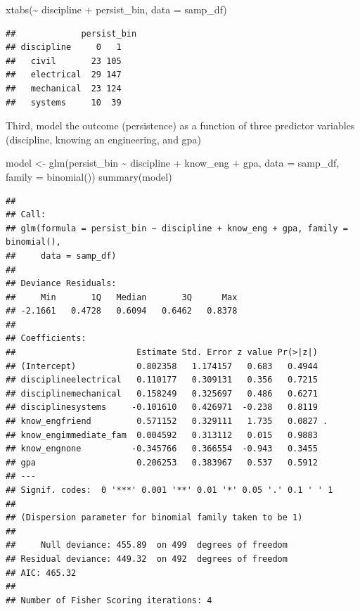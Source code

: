 \documentclass[
]{book}
\newenvironment{Shaded}{\begin{snugshade}}{\end{snugshade}}
\newcommand{\AttributeTok}[1]{\textcolor[rgb]{0.77,0.63,0.00}{#1}}
\newcommand{\FunctionTok}[1]{\textcolor[rgb]{0.00,0.00,0.00}{#1}}
\newcommand{\NormalTok}[1]{#1}
\newcommand{\OtherTok}[1]{\textcolor[rgb]{0.56,0.35,0.01}{#1}}
\newcommand{\SpecialCharTok}[1]{\textcolor[rgb]{0.00,0.00,0.00}{#1}}
\begin{document}
\begin{Shaded}
\begin{Highlighting}[]
\FunctionTok{xtabs}\NormalTok{(}\SpecialCharTok{\textasciitilde{}}\NormalTok{ discipline }\SpecialCharTok{+}\NormalTok{ persist\_bin, }\AttributeTok{data =}\NormalTok{ samp\_df)}
\end{Highlighting}
\end{Shaded}

\begin{verbatim}
##             persist_bin
## discipline     0   1
##   civil       23 105
##   electrical  29 147
##   mechanical  23 124
##   systems     10  39
\end{verbatim}

Third, model the outcome (persistence) as a function of three predictor variables (discipline, knowing an engineering, and gpa)

\begin{Shaded}
\begin{Highlighting}[]
\NormalTok{model }\OtherTok{\textless{}{-}} \FunctionTok{glm}\NormalTok{(persist\_bin }\SpecialCharTok{\textasciitilde{}}\NormalTok{ discipline }\SpecialCharTok{+}\NormalTok{ know\_eng }\SpecialCharTok{+}\NormalTok{ gpa, }\AttributeTok{data =}\NormalTok{ samp\_df, }\AttributeTok{family =} \FunctionTok{binomial}\NormalTok{())}
\FunctionTok{summary}\NormalTok{(model)}
\end{Highlighting}
\end{Shaded}

\begin{verbatim}
## 
## Call:
## glm(formula = persist_bin ~ discipline + know_eng + gpa, family = binomial(), 
##     data = samp_df)
## 
## Deviance Residuals: 
##     Min       1Q   Median       3Q      Max  
## -2.1661   0.4728   0.6094   0.6462   0.8378  
## 
## Coefficients:
##                        Estimate Std. Error z value Pr(>|z|)  
## (Intercept)            0.802358   1.174157   0.683   0.4944  
## disciplineelectrical   0.110177   0.309131   0.356   0.7215  
## disciplinemechanical   0.158249   0.325697   0.486   0.6271  
## disciplinesystems     -0.101610   0.426971  -0.238   0.8119  
## know_engfriend         0.571152   0.329111   1.735   0.0827 .
## know_engimmediate_fam  0.004592   0.313112   0.015   0.9883  
## know_engnone          -0.345766   0.366554  -0.943   0.3455  
## gpa                    0.206253   0.383967   0.537   0.5912  
## ---
## Signif. codes:  0 '***' 0.001 '**' 0.01 '*' 0.05 '.' 0.1 ' ' 1
## 
## (Dispersion parameter for binomial family taken to be 1)
## 
##     Null deviance: 455.89  on 499  degrees of freedom
## Residual deviance: 449.32  on 492  degrees of freedom
## AIC: 465.32
## 
## Number of Fisher Scoring iterations: 4
\end{verbatim}
\end{document}
